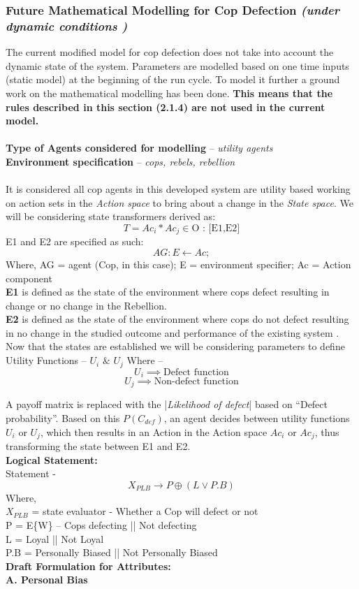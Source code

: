 \documentclass[a4paper,11pt]{article}
\begin{document}
\subsubsection{Future Mathematical Modelling for Cop Defection \textit{ (under dynamic conditions ) }}
The current modified model for cop defection does not take into account the dynamic state of the system. Parameters are modelled based on one time inputs (static model) at the beginning of the run cycle. To model it further a ground work on the mathematical modelling has been done. \textbf{This means that the rules described in this section (2.1.4) are not used in the current model.}\\
\\
\textbf{Type of Agents considered for modelling} – \textit{utility agents} \cite{WooldridgeMAS}\\
\textbf{Environment specification} – \textit{cops, rebels, rebellion} \cite{epstein2002modeling}\\
\\It is considered all cop agents in this developed system are utility based working on action sets in the \textit{Action space} to bring about a change in the \textit{State space}. We will be considering state transformers derived as:
\[ T = Ac_i * Ac_j \in \text{O : [E1,E2]}\]
E1 and E2 are specified as such: \[AG : E \longleftarrow Ac;\]
Where, AG = agent (Cop, in this case); E = environment specifier; Ac = Action component\\
\textbf{E1} is defined as the state of the environment where cops defect resulting in change or no change in the Rebellion.\\
\textbf{E2} is defined as the state of the environment where cops do not defect resulting in no change in the studied outcome and performance of the existing system \cite{epstein2002modeling}.\\

Now that the states are established we will be considering parameters to define Utility Functions \cite{WooldridgeMAS} – $U_i$ $\&$ $U_j$
Where – 
  \[U_i \implies \text{Defect function}\]
  \[U_j \implies \text{Non-defect function} \]

A payoff matrix is replaced with the |\textit{Likelihood of defect}| based on “Defect probability”. Based on this $P(C_{def})$, an agent decides between utility functions  $U_i$ or $U_j$, which then results in an Action in the Action space $Ac_i$ or $Ac_j$, thus transforming the state between E1 and E2.\\
\textbf{Logical Statement:}\\
Statement -             \[X_{PLB} \longrightarrow P \oplus  (L \lor P.B)\]
Where, \\
	$X_{PLB}$  = state evaluator - Whether a Cop will defect or not\\
	P = E\{W\} – Cops defecting || Not defecting \\
	L = Loyal || Not Loyal\\
	P.B = Personally Biased || Not Personally Biased\\
\textbf{Draft Formulation for Attributes:}\\
\textbf{A. Personal Bias }
\end{document}
